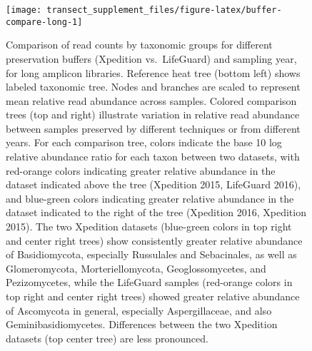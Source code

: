 \documentclass[
]{article}
\begin{document}
\begin{figure}

{\centering \texttt{[image: transect\_supplement\_files/figure-latex/buffer-compare-long-1]} 

}

\caption[Comparison of read counts by taxonomic groups for different preservation buffers (Xpedition vs.~LifeGuard) and sampling year, for long amplicon libraries]{Comparison of read counts by taxonomic groups for different preservation buffers (Xpedition vs.~LifeGuard) and sampling year, for long amplicon libraries. Reference heat tree (bottom left) shows labeled taxonomic tree.
Nodes and branches are scaled to represent mean relative read abundance across samples.
Colored comparison trees (top and right) illustrate variation in relative read abundance between samples preserved by different techniques or from different years.
For each comparison tree, colors indicate the base 10 log relative abundance ratio for each taxon between two datasets, with red-orange colors indicating greater relative abundance in the dataset indicated above the tree (Xpedition 2015, LifeGuard 2016), and blue-green colors indicating greater relative abundance in the dataset indicated to the right of the tree (Xpedition 2016, Xpedition 2015).
The two Xpedition datasets (blue-green colors in top right and center right trees) show consistently greater relative abundance of Basidiomycota, especially Russulales and Sebacinales, as well as Glomeromycota, Morteriellomycota, Geoglossomycetes, and Pezizomycetes,
while the LifeGuard samples (red-orange colors in top right and center right trees) showed greater relative abundance of Ascomycota in general, especially Aspergillaceae, and also Geminibasidiomycetes.
Differences between the two Xpedition datasets (top center tree) are less pronounced.}\label{fig:buffer-compare-long}
\end{figure}
\end{document}
